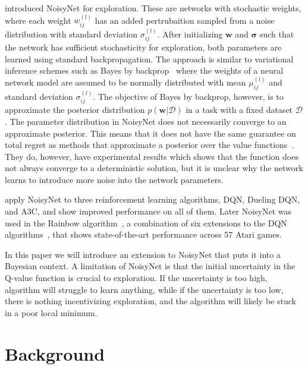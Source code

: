 \documentclass[]{uai2021} %
\begin{document}
\citet{fortunato_noisy_2019} introduced NoisyNet for exploration.
These are networks with stochastic weights, where each weight \(w^{(l)}_{ij}\)
has an added pertrubaition sampled from a noise distribution with standard deviation \(\sigma^{(l)}_{ij}\).
After initializing \(\bm{w}\) and \(\bm{\sigma}\) such that the network has sufficient
stochasticity for exploration, both parameters are learned using standard backpropagation.
The approach is similar to variational inference schemes such as Bayes by backprop~\citep{blundell_weight_2015} where the weights of a neural network model are assumed to be normally distributed with mean 
\(\mu^{(l)}_{ij}\) and standard deviation \(\sigma^{(l)}_{ij}\). The objective of
Bayes by backprop, however, is to approximate the posterior distribution
\(p(\bm{w} \vert \mathcal{D})\) in a task with a fixed dataset \(\mathcal{D}\).
The parameter distribution in NoisyNet does not necessarily
converge to an approximate posterior. This means that it does not have the same
guarantee on total regret as methods that approximate a posterior over the
value functions~\citep{osband_generalization_2016}. They do, however, have
experimental results which shows that the function does not always converge to
a deterministic solution, but it is unclear why the network learns to introduce
more noise into the network parameters.

\citet{fortunato_noisy_2019} apply NoisyNet to three reinforcement learning
algorithms, DQN, Dueling DQN, and A3C, and show improved performance on all
of them. Later NoisyNet was used in the Rainbow 
algorithm~\citep{hessel_rainbow_2017}, a combination of six extensions to the
DQN algorithms~\citep{fortunato_noisy_2019, bellemare_distributional_2017, wang_dueling_2016,van_hasselt_deep_2015,schaul_prioritized_2016,mnih_asynchronous_2016}, that shows state-of-the-art performance across 57 Atari games.

In this paper we will introduce an extension to NoisyNet that puts it into a Bayesian context. A limitation of NoisyNet is that the initial uncertainty in the Q-value function is crucial to exploration. If the uncertainty is too high, algorithm will struggle to learn anything, while if the uncertainty is too low, there is nothing incentivizing exploration, and the algorithm will likely be stuck in a poor local minimum.

\section{Background}
\end{document}
